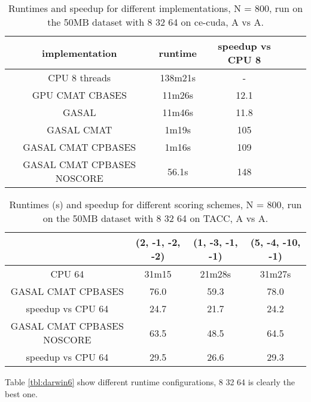 \documentclass[../thesis.tex]{subfiles}
\begin{document}
\begin{table}
\centering
\caption{Runtimes and speedup for different implementations, N = 800, run on the 50MB dataset with 8 32 64 on ce-cuda, A vs A.}
\label{tbl:darwin3}
\begin{tabular}{c c c c c}
implementation & runtime & speedup vs CPU 8 \\ \hline
CPU 8 threads & 138m21s & - \\
GPU CMAT CBASES & 11m26s & 12.1 \\
GASAL & 11m46s & 11.8 \\
GASAL CMAT & 1m19s & 105 \\
GASAL CMAT CPBASES & 1m16s & 109 \\
GASAL CMAT CPBASES NOSCORE & 56.1s & 148 \\
\end{tabular}
\end{table}


\begin{table}
\centering
\caption{Runtimes (s) and speedup for different scoring schemes, N = 800, run on the 50MB dataset with 8 32 64 on TACC, A vs A.}
\label{tbl:darwin8}
\begin{tabular}{c||c|c|c}
& (2, -1, -2, -2) & (1, -3, -1, -1) & (5, -4, -10, -1) \\ \hline
CPU 64 & 31m15 & 21m28s & 31m27s \\ \hline
GASAL CMAT CPBASES & 76.0 & 59.3 & 78.0 \\
speedup vs CPU 64 & 24.7 & 21.7 & 24.2 \\ \hline
GASAL CMAT CPBASES NOSCORE & 63.5 & 48.5 & 64.5 \\
speedup vs CPU 64 & 29.5 & 26.6 & 29.3 \\
\end{tabular}
\end{table}








Table \ref{tbl:darwin6} show different runtime configurations, 8 32 64 is clearly the best one.
\end{document}
